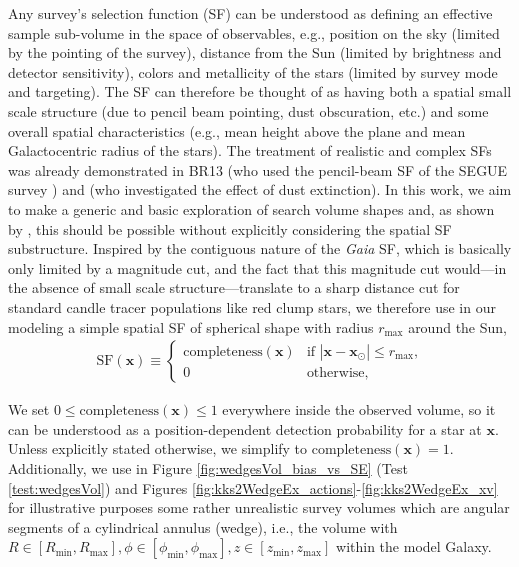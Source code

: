 \documentclass[iop,revtex4,numberedappendix,appendixfloats]{emulateapj}
\newcommand{\vect}[1]{\boldsymbol{#1}}
\begin{document}
Any survey's selection function (SF) can be understood as defining an effective sample sub-volume in the space of observables, e.g., position on the sky (limited by the pointing of the survey), distance from the Sun (limited by brightness and detector sensitivity), colors and metallicity of the stars (limited by survey mode and targeting). The SF can therefore be thought of as having both a spatial small scale structure (due to pencil beam pointing, dust obscuration, etc.) and some overall spatial characteristics (e.g., mean height above the plane and mean Galactocentric radius of the stars). The treatment of realistic and complex SFs was already demonstrated in BR13 (who used the pencil-beam SF of the SEGUE survey \citep{2012ApJ...753..148B}) and \citet{2016ApJ...818..130B} (who investigated the effect of dust extinction). In this work, we aim to make a generic and basic exploration of search volume shapes and, as shown by \citet{2016ApJ...818..130B}, this should be possible without explicitly considering the spatial SF substructure. Inspired by the contiguous nature of the \emph{Gaia} SF, which is basically only limited by a magnitude cut, and the fact that this magnitude cut would---in the absence of small scale structure---translate to a sharp distance cut for standard candle tracer populations like red clump stars, we therefore use in our modeling a simple spatial SF of spherical shape with radius $r_\text{max}$ around the Sun,
\begin{eqnarray}
\text{SF}(\vect{x}) \equiv \begin{cases}
\text{completeness}(\vect{x}) &\text{if $|\vect{x}-\vect{x}_\odot| \leq r_\text{max}$,}\\
0 & \text{otherwise,}
\end{cases} \label{eq:selectionfunction}
\end{eqnarray}

We set $0 \leq \text{completeness}(\vect{x}) \leq 1$ everywhere inside the observed volume, so it can be understood as a position-dependent detection probability for a star at $\vect{x}$. Unless explicitly stated otherwise, we simplify to $\text{completeness}(\vect{x}) = 1$. Additionally, we use in Figure \ref{fig:wedgesVol_bias_vs_SE} (Test \ref{test:wedgesVol}) and Figures \ref{fig:kks2WedgeEx_actions}-\ref{fig:kks2WedgeEx_xv} for illustrative purposes some rather unrealistic survey volumes which are angular segments of a cylindrical annulus (wedge), i.e., the volume with $R \in [R_\text{min},R_\text{max}],\phi \in [\phi_\text{min},\phi_\text{max}],z \in [z_\text{min},z_\text{max}]$ within the model Galaxy. 

\end{document}
